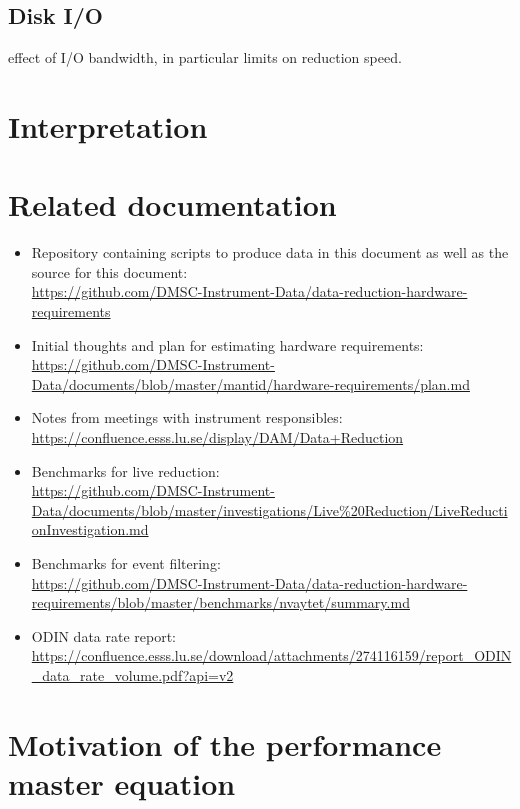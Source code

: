 \documentclass[a4paper,english,numbers=noenddot,bibliography=totoc,chapterprefix=on,DIV=12]{scrartcl}
\newcommand{\odin}{ODIN\xspace}
\begin{document}
\subsection{Disk I/O}

effect of I/O bandwidth, in particular limits on reduction speed.


\section{Interpretation}




\appendix

\section{Related documentation}

\begin{itemize}
  \item Repository containing scripts to produce data in this document as well as the source for this document:\\
    \url{https://github.com/DMSC-Instrument-Data/data-reduction-hardware-requirements}
  \item Initial thoughts and plan for estimating hardware requirements:\\
    \url{https://github.com/DMSC-Instrument-Data/documents/blob/master/mantid/hardware-requirements/plan.md}
  \item Notes from meetings with instrument responsibles:\\
    \url{https://confluence.esss.lu.se/display/DAM/Data+Reduction}
  \item Benchmarks for live reduction:\\
    \url{https://github.com/DMSC-Instrument-Data/documents/blob/master/investigations/Live%20Reduction/LiveReductionInvestigation.md}
  \item Benchmarks for event filtering:\\
    \url{https://github.com/DMSC-Instrument-Data/data-reduction-hardware-requirements/blob/master/benchmarks/nvaytet/summary.md}
  \item \odin data rate report:\\
    \url{https://confluence.esss.lu.se/download/attachments/274116159/report_ODIN_data_rate_volume.pdf?api=v2}
\end{itemize}

\section{Motivation of the performance master equation}
\label{app:master_eq}
\end{document}
